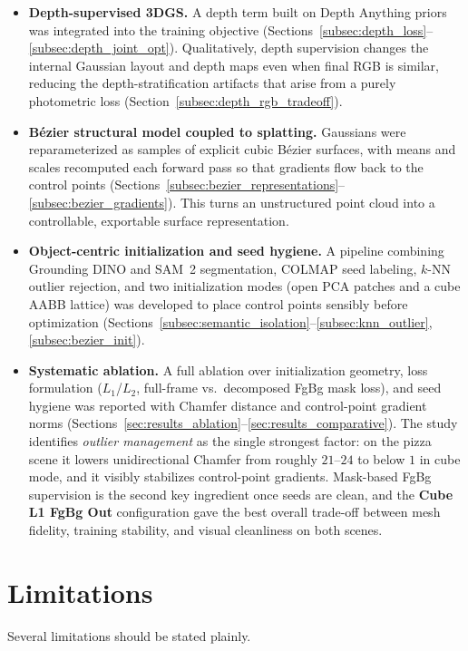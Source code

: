 \begin{itemize}
    \item \textbf{Depth-supervised 3DGS.} A depth term built on Depth Anything priors was integrated into the training objective (Sections~\ref{subsec:depth_loss}--\ref{subsec:depth_joint_opt}). Qualitatively, depth supervision changes the internal Gaussian layout and depth maps even when final RGB is similar, reducing the depth-stratification artifacts that arise from a purely photometric loss (Section~\ref{subsec:depth_rgb_tradeoff}).
    \item \textbf{B\'ezier structural model coupled to splatting.} Gaussians were reparameterized as samples of explicit cubic B\'ezier surfaces, with means and scales recomputed each forward pass so that gradients flow back to the control points (Sections~\ref{subsec:bezier_representations}--\ref{subsec:bezier_gradients}). This turns an unstructured point cloud into a controllable, exportable surface representation.
    \item \textbf{Object-centric initialization and seed hygiene.} A pipeline combining Grounding DINO and SAM~2 segmentation, COLMAP seed labeling, $k$-NN outlier rejection, and two initialization modes (open PCA patches and a cube AABB lattice) was developed to place control points sensibly before optimization (Sections~\ref{subsec:semantic_isolation}--\ref{subsec:knn_outlier}, \ref{subsec:bezier_init}).
    \item \textbf{Systematic ablation.} A full ablation over initialization geometry, loss formulation ($L_1$/$L_2$, full-frame vs.\ decomposed FgBg mask loss), and seed hygiene was reported with Chamfer distance and control-point gradient norms (Sections~\ref{sec:results_ablation}--\ref{sec:results_comparative}). The study identifies \emph{outlier management} as the single strongest factor: on the pizza scene it lowers unidirectional Chamfer from roughly $21$--$24$ to below $1$ in cube mode, and it visibly stabilizes control-point gradients. Mask-based FgBg supervision is the second key ingredient once seeds are clean, and the \textbf{Cube L1 FgBg Out} configuration gave the best overall trade-off between mesh fidelity, training stability, and visual cleanliness on both scenes.
\end{itemize}

\section{Limitations}

Several limitations should be stated plainly.

